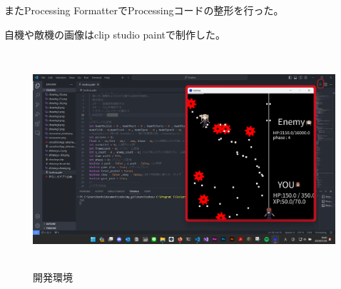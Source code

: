 \documentclass[a4paper,titlepage,11pt]{ltjsarticle}
\begin{document}
またProcessing FormatterでProcessingコードの整形を行った。

自機や敵機の画像はclip studio paintで制作した。
\begin{figure}[H]
	\begin{center}
		\includegraphics*[height = 8cm]{invent_view.png}
		\caption{開発環境}
		\label{inventry}
	\end{center}
\end{figure}
\end{document}
